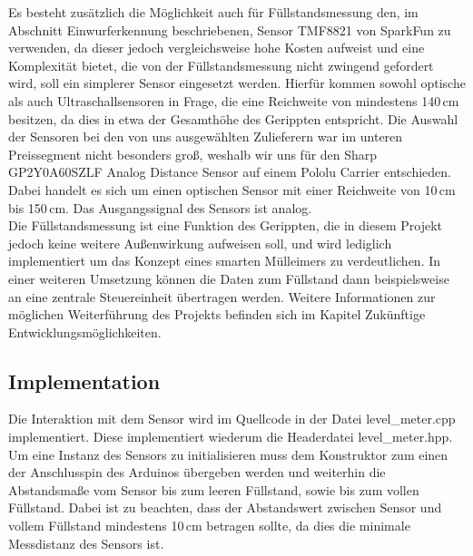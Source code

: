         Es besteht zusätzlich die Möglichkeit auch für Füllstandsmessung den, im Abschnitt Einwurferkennung beschriebenen, Sensor TMF8821 von SparkFun zu verwenden, da dieser jedoch vergleichsweise hohe Kosten aufweist und eine Komplexität bietet, die von der Füllstandsmessung nicht zwingend gefordert wird, soll ein simplerer Sensor eingesetzt werden. Hierfür kommen sowohl optische als auch Ultraschallsensoren in Frage, die eine Reichweite von mindestens 140\,cm besitzen, da dies in etwa der Gesamthöhe des Gerippten entspricht. Die Auswahl der Sensoren bei den von uns ausgewählten Zulieferern war im unteren Preissegment nicht besonders groß, weshalb wir uns für den Sharp GP2Y0A60SZLF Analog Distance Sensor auf einem Pololu Carrier entschieden. Dabei handelt es sich um einen optischen Sensor mit einer Reichweite von 10\,cm bis 150\,cm. Das Ausgangssignal des Sensors ist analog.\\

        Die Füllstandsmessung ist eine Funktion des Gerippten, die in diesem Projekt jedoch keine weitere Außenwirkung aufweisen soll, und wird lediglich implementiert um das Konzept eines smarten Mülleimers zu verdeutlichen. In einer weiteren Umsetzung können die Daten zum Füllstand dann beispielsweise an eine zentrale Steuereinheit übertragen werden. Weitere Informationen zur möglichen Weiterführung des Projekts befinden sich im Kapitel Zukünftige Entwicklungsmöglichkeiten.\\

    \subsection{Implementation} 
        Die Interaktion mit dem Sensor wird im Quellcode in der Datei level\_meter.cpp implementiert. Diese implementiert wiederum die Headerdatei level\_meter.hpp. Um eine Instanz des Sensors zu initialisieren muss dem Konstruktor zum einen der Anschlusspin des Arduinos übergeben werden und weiterhin die Abstandsmaße vom Sensor bis zum leeren Füllstand, sowie bis zum vollen Füllstand. Dabei ist zu beachten, dass der Abstandswert zwischen Sensor und vollem Füllstand mindestens 10\,cm betragen sollte, da dies die minimale Messdistanz des Sensors ist.

